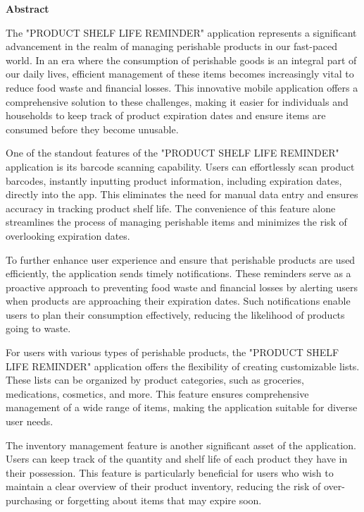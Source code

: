 \thispagestyle{empty}
\newpage
\cleardoublepage{}
{}
\begin{center}
{\Large \bf Abstract}\\
\end{center}
\vspace{10pt}

The "PRODUCT SHELF LIFE REMINDER" application represents a significant advancement in the realm of managing perishable products in our fast-paced world. In an era where the consumption of perishable goods is an integral part of our daily lives, efficient management of these items becomes increasingly vital to reduce food waste and financial losses. This innovative mobile application offers a comprehensive solution to these challenges, making it easier for individuals and households to keep track of product expiration dates and ensure items are consumed before they become unusable.

One of the standout features of the "PRODUCT SHELF LIFE REMINDER" application is its barcode scanning capability. Users can effortlessly scan product barcodes, instantly inputting product information, including expiration dates, directly into the app. This eliminates the need for manual data entry and ensures accuracy in tracking product shelf life. The convenience of this feature alone streamlines the process of managing perishable items and minimizes the risk of overlooking expiration dates.

To further enhance user experience and ensure that perishable products are used efficiently, the application sends timely notifications. These reminders serve as a proactive approach to preventing food waste and financial losses by alerting users when products are approaching their expiration dates. Such notifications enable users to plan their consumption effectively, reducing the likelihood of products going to waste.

For users with various types of perishable products, the "PRODUCT SHELF LIFE REMINDER" application offers the flexibility of creating customizable lists. These lists can be organized by product categories, such as groceries, medications, cosmetics, and more. This feature ensures comprehensive management of a wide range of items, making the application suitable for diverse user needs. 

The inventory management feature is another significant asset of the application. Users can keep track of the quantity and shelf life of each product they have in their possession. This feature is particularly beneficial for users who wish to maintain a clear overview of their product inventory, reducing the risk of over-purchasing or forgetting about items that may expire soon.

